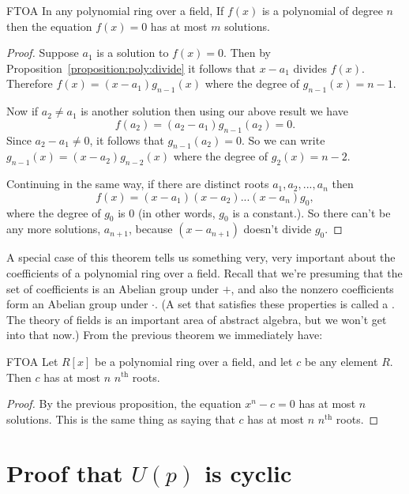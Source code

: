\begin {prop}{FTOA}
In any polynomial ring over a field, If $f(x)$ is a polynomial of degree $n$ then the equation $f(x)=0$ has at most $m$ solutions.
\end {prop}


\begin {proof}
Suppose $a_1$ is a solution to $f(x)=0$. Then by Proposition~\ref{proposition:poly:divide} it follows that $x-a_1$ divides $f(x)$. Therefore $f(x) = (x-a_1) g_{n-1}(x)$ where the degree of $g_{n-1}(x)=n-1$. 

Now if $a_2 \neq a_1$ is another solution then using our above result we have
\[ f(a_2) = (a_2 - a_1)g_{n-1}(a_2) = 0. \]
Since $a_2 - a_1 \neq 0$, it follows that $g_{n-1}(a_2) = 0$. So we can write $g_{n - 1}(x) = (x-a_2)g_{n-2}(x)$ where the degree of $g_2(x) = n-2$. 

Continuing in the same way, if there are distinct roots $a_1,a_2,...,a_n$ then 
\[
f(x) = (x - a_1)(x - a_2)...(x - a_n)g_0,\]
 where the degree of $g_0$ is 0 (in other words, $g_0$ is a constant.). So there can't be any more solutions, $a_{n+1}$, because $(x-a_{n+1})$ doesn't divide $g_0$.
\end {proof}

A special case of this theorem tells us something very, very important about the coefficients of a polynomial ring over a field.  Recall that we're presuming that the set of coefficients is an Abelian group under $+$, and also the nonzero coefficients form an Abelian group under $\cdot$.  (A set that satisfies these properties is called a . The theory of fields is an important area of abstract algebra, but we won't get into that now.)   From the previous theorem we immediately have:

\begin {prop}{FTOA}
Let $R[x]$ be a polynomial ring over a field, and let $c$ be any element $R$.  Then $c$ has at most $n$ $n^{\text{th}}$ roots.
\end {prop}


\begin {proof}
By the previous proposition, the equation $x^n-c=0$ has at most $n$ solutions.  This is the same thing as saying that $c$ has at most $n$ $n^{\text{th}}$ roots.
\end {proof}




\section{Proof that $U(p)$ is cyclic}

